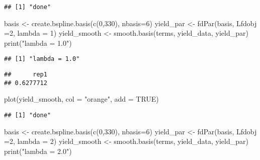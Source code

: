 \documentclass[
]{article}
\newenvironment{Shaded}{\begin{snugshade}}{\end{snugshade}}
\newcommand{\AttributeTok}[1]{\textcolor[rgb]{0.77,0.63,0.00}{#1}}
\newcommand{\ConstantTok}[1]{\textcolor[rgb]{0.00,0.00,0.00}{#1}}
\newcommand{\DecValTok}[1]{\textcolor[rgb]{0.00,0.00,0.81}{#1}}
\newcommand{\FunctionTok}[1]{\textcolor[rgb]{0.00,0.00,0.00}{#1}}
\newcommand{\NormalTok}[1]{#1}
\newcommand{\OtherTok}[1]{\textcolor[rgb]{0.56,0.35,0.01}{#1}}
\newcommand{\SpecialCharTok}[1]{\textcolor[rgb]{0.00,0.00,0.00}{#1}}
\newcommand{\StringTok}[1]{\textcolor[rgb]{0.31,0.60,0.02}{#1}}
\begin{document}
\begin{verbatim}
## [1] "done"
\end{verbatim}

\begin{Shaded}
\begin{Highlighting}[]
\NormalTok{basis }\OtherTok{\textless{}{-}} \FunctionTok{create.bspline.basis}\NormalTok{(}\FunctionTok{c}\NormalTok{(}\DecValTok{0}\NormalTok{,}\DecValTok{330}\NormalTok{), }\AttributeTok{nbasis=}\DecValTok{6}\NormalTok{)}
\NormalTok{yield\_par }\OtherTok{\textless{}{-}} \FunctionTok{fdPar}\NormalTok{(basis, }\AttributeTok{Lfdobj =}\DecValTok{2}\NormalTok{, }\AttributeTok{lambda =} \DecValTok{1}\NormalTok{)}
\NormalTok{yield\_smooth }\OtherTok{\textless{}{-}} \FunctionTok{smooth.basis}\NormalTok{(terms, yield\_data, yield\_par)}
\FunctionTok{print}\NormalTok{(}\StringTok{"lambda = 1.0"}\NormalTok{)}
\end{Highlighting}
\end{Shaded}

\begin{verbatim}
## [1] "lambda = 1.0"
\end{verbatim}

\begin{Shaded}
\end{Shaded}

\begin{verbatim}
##      rep1 
## 0.6277712
\end{verbatim}

\begin{Shaded}
\begin{Highlighting}[]
\FunctionTok{plot}\NormalTok{(yield\_smooth, }\AttributeTok{col =} \StringTok{"orange"}\NormalTok{, }\AttributeTok{add =} \ConstantTok{TRUE}\NormalTok{)}
\end{Highlighting}
\end{Shaded}

\begin{verbatim}
## [1] "done"
\end{verbatim}

\begin{Shaded}
\begin{Highlighting}[]
\NormalTok{basis }\OtherTok{\textless{}{-}} \FunctionTok{create.bspline.basis}\NormalTok{(}\FunctionTok{c}\NormalTok{(}\DecValTok{0}\NormalTok{,}\DecValTok{330}\NormalTok{), }\AttributeTok{nbasis=}\DecValTok{6}\NormalTok{)}
\NormalTok{yield\_par }\OtherTok{\textless{}{-}} \FunctionTok{fdPar}\NormalTok{(basis, }\AttributeTok{Lfdobj =}\DecValTok{2}\NormalTok{, }\AttributeTok{lambda =} \DecValTok{2}\NormalTok{)}
\NormalTok{yield\_smooth }\OtherTok{\textless{}{-}} \FunctionTok{smooth.basis}\NormalTok{(terms, yield\_data, yield\_par)}
\FunctionTok{print}\NormalTok{(}\StringTok{"lambda = 2.0"}\NormalTok{)}
\end{Highlighting}
\end{Shaded}
\end{document}
